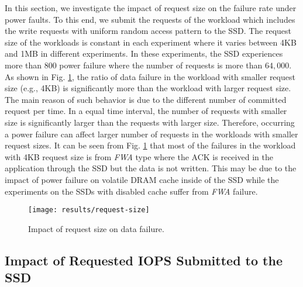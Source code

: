 In this section, we investigate the impact of request size on the failure rate under power faults. To this end, we submit the requests of the workload which includes the write requests with uniform random access pattern to the SSD. The request size of the workloads is constant in each experiment where it varies between 4KB and 1MB in different experiments.
In these experiments, the SSD experiences more than 800 power failure where the number of requests is more than $64,000$.
As shown in Fig. \ref{req_size}, the ratio of data failure in the workload with smaller request size (e.g., 4KB) is significantly more than the workload with larger request size. The main reason of such behavior is due to the different number of committed request per time. In a equal time interval, the number of requests with smaller size is significantly larger than the requests with larger size. Therefore, occurring a power failure can affect larger number of requests in the workloads with smaller request sizes. It can be seen from Fig. \ref{req_size} that most of the failures in the workload with 4KB request size is from \emph{FWA} type where the ACK is received in the application through the SSD but the data is not written. This may be due to the impact of power failure on volatile DRAM cache inside of the SSD while the experiments on the SSDs with disabled cache suffer from \emph{FWA} failure.
\begin{figure}[t]
	\centering
	\texttt{[image: results/request-size]}
	\vspace{-0.5em}
	\caption{Impact of request size on data failure.}
	\vspace{-2em}
	\label{req_size}
\end{figure}

\vspace{-1em}
\subsection{Impact of Requested IOPS Submitted to the SSD}
\vspace{-0.7em}
\label{sec:req_rate}

